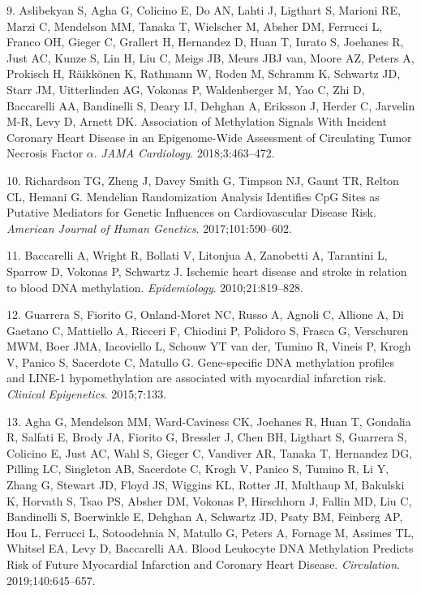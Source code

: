 \documentclass[]{article}
\begin{document}
\leavevmode\hypertarget{ref-Aslibekyan2018}{}%
9. Aslibekyan S, Agha G, Colicino E, Do AN, Lahti J, Ligthart S, Marioni
RE, Marzi C, Mendelson MM, Tanaka T, Wielscher M, Absher DM, Ferrucci L,
Franco OH, Gieger C, Grallert H, Hernandez D, Huan T, Iurato S, Joehanes
R, Just AC, Kunze S, Lin H, Liu C, Meigs JB, Meurs JBJ van, Moore AZ,
Peters A, Prokisch H, Räikkönen K, Rathmann W, Roden M, Schramm K,
Schwartz JD, Starr JM, Uitterlinden AG, Vokonas P, Waldenberger M, Yao
C, Zhi D, Baccarelli AA, Bandinelli S, Deary IJ, Dehghan A, Eriksson J,
Herder C, Jarvelin M-R, Levy D, Arnett DK. Association of Methylation
Signals With Incident Coronary Heart Disease in an Epigenome-Wide
Assessment of Circulating Tumor Necrosis Factor \(\alpha\). \emph{JAMA
Cardiology}. 2018;3:463--472.

\leavevmode\hypertarget{ref-Richardson2017}{}%
10. Richardson TG, Zheng J, Davey Smith G, Timpson NJ, Gaunt TR, Relton
CL, Hemani G. Mendelian Randomization Analysis Identifies CpG Sites as
Putative Mediators for Genetic Influences on Cardiovascular Disease
Risk. \emph{American Journal of Human Genetics}. 2017;101:590--602.

\leavevmode\hypertarget{ref-Baccarelli2010}{}%
11. Baccarelli A, Wright R, Bollati V, Litonjua A, Zanobetti A,
Tarantini L, Sparrow D, Vokonas P, Schwartz J. Ischemic heart disease
and stroke in relation to blood DNA methylation. \emph{Epidemiology}.
2010;21:819--828.

\leavevmode\hypertarget{ref-Guarrera2015}{}%
12. Guarrera S, Fiorito G, Onland-Moret NC, Russo A, Agnoli C, Allione
A, Di Gaetano C, Mattiello A, Ricceri F, Chiodini P, Polidoro S, Frasca
G, Verschuren MWM, Boer JMA, Iacoviello L, Schouw YT van der, Tumino R,
Vineis P, Krogh V, Panico S, Sacerdote C, Matullo G. Gene-specific DNA
methylation profiles and LINE-1 hypomethylation are associated with
myocardial infarction risk. \emph{Clinical Epigenetics}. 2015;7:133.

\leavevmode\hypertarget{ref-Agha2019}{}%
13. Agha G, Mendelson MM, Ward-Caviness CK, Joehanes R, Huan T, Gondalia
R, Salfati E, Brody JA, Fiorito G, Bressler J, Chen BH, Ligthart S,
Guarrera S, Colicino E, Just AC, Wahl S, Gieger C, Vandiver AR, Tanaka
T, Hernandez DG, Pilling LC, Singleton AB, Sacerdote C, Krogh V, Panico
S, Tumino R, Li Y, Zhang G, Stewart JD, Floyd JS, Wiggins KL, Rotter JI,
Multhaup M, Bakulski K, Horvath S, Tsao PS, Absher DM, Vokonas P,
Hirschhorn J, Fallin MD, Liu C, Bandinelli S, Boerwinkle E, Dehghan A,
Schwartz JD, Psaty BM, Feinberg AP, Hou L, Ferrucci L, Sotoodehnia N,
Matullo G, Peters A, Fornage M, Assimes TL, Whitsel EA, Levy D,
Baccarelli AA. Blood Leukocyte DNA Methylation Predicts Risk of Future
Myocardial Infarction and Coronary Heart Disease. \emph{Circulation}.
2019;140:645--657.
\end{document}
